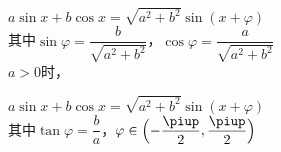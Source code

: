 \begin{description}[leftmargin=0pt,labelsep=0pt]
        \item%
          \begin{itemizeMy}
            \item $a\sin x+b\cos x=\sqrt{a^2+b^2}\sin(x+\varphi)$\\
            其中$\sin\varphi=\dfrac{b}{\sqrt{a^2+b^2}}$，$\cos\varphi=\dfrac{a}{\sqrt{a^2+b^2}}$\\
            $a>0$时，
            \item $a\sin x+b\cos x=\sqrt{a^2+b^2}\sin(x+\varphi)$\\
            其中$\tan\varphi=\dfrac{b}a$，$
            \varphi\in\Bigl(-\dfrac{\piup}2,\dfrac{\piup}2\Bigr)$
          \end{itemizeMy}
    \end{description}
